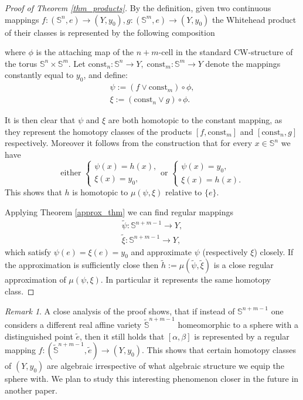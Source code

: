 \documentclass{article}
\theoremstyle{plain}
\theoremstyle{definition}
\theoremstyle{remark}
\newtheorem{rem}{Remark}[thm]
\newcommand{\s}{\mathbb{S}}
\begin{document}
\begin{proof}[Proof of Theorem \ref{thm_products}]
By the definition, given two continuous mappings $f:(\s^n,e)\rightarrow (Y,y_0),g:(\s^m,e)\rightarrow (Y,y_0)$ the Whitehead product of their classes is represented by the following composition
\begin{center}
\end{center}
where $\phi$ is the attaching map of the $n+m$-cell in the standard CW-structure of the torus $\s^n\times \s^m$. Let $\text{const}_n:\s^n\rightarrow Y,\;\text{const}_m:\s^m\rightarrow Y$ denote the mappings constantly equal to $y_0$, and define:
\begin{align*}
    \psi:=(f\vee \text{const}_m)\circ \phi, \\
    \xi:=(\text{const}_n\vee g)\circ \phi.
\end{align*}

It is then clear that $\psi$ and $\xi$ are both homotopic to the constant mapping, as they represent the homotopy classes of the products $[f,\text{const}_m]$ and $[\text{const}_n, g]$ respectively. Moreover it follows from the construction that for every $x\in \s^n$ we have
\begin{equation*}
\text{either }
\begin{cases}
\psi(x)=h(x),\\
\xi(x)=y_0,
\end{cases}
\text{or }
\begin{cases}
\psi(x)=y_0,\\
\xi(x)=h(x).
\end{cases}
\end{equation*}
This shows that $h$ is homotopic to $\mu(\psi,\xi)$ relative to $\{e\}$.

Applying Theorem \ref{approx_thm} we can find regular mappings 
\begin{align*}
    \tilde{\psi}:\s^{n+m-1}\rightarrow Y,\\
    \tilde{\xi}:\s^{n+m-1}\rightarrow Y,
\end{align*}
which satisfy $\psi(e)=\xi(e)=y_0$ and approximate $\psi$ (respectively $\xi$) closely. If the approximation is sufficiently close then $\tilde{h}:=\mu(\tilde{\psi},\tilde{\xi})$ is a close regular approximation of $\mu(\psi,\xi)$. In particular it represents the same homotopy class.
\end{proof}
\begin{rem} 
A close analysis of the proof shows, that if instead of $\s^{n+m-1}$ one considers a different real affine variety $\widetilde{\s}^{n+m-1}$ homeomorphic to a sphere with a distinguished point $\tilde{e}$, then it still holds that $[\alpha,\beta]$ is represented by a regular mapping $f:(\widetilde{\s}^{n+m-1},\tilde{e})\rightarrow (Y,y_0)$. This shows that certain homotopy classes of $(Y,y_0)$ are algebraic irrespective of what algebraic structure we equip the sphere with. We plan to study this interesting phenomenon closer in the future in another paper.
\end{rem}
\end{document}
